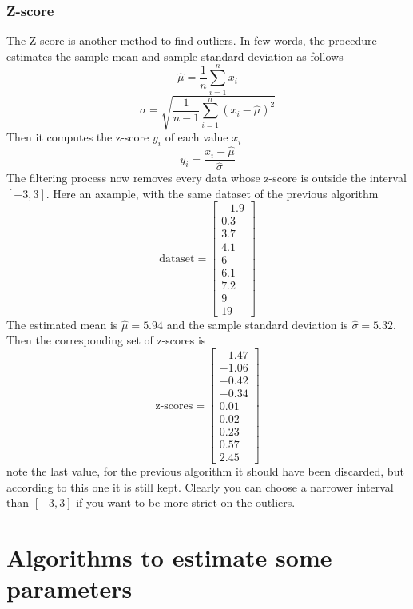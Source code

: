 \documentclass[12pt,twoside]{report}
\begin{document}
\subsection{Z-score}
The Z-score is another method to find outliers. In few words, the procedure estimates the sample mean and sample standard deviation as follows
\begin{equation}
    \hat{\mu}=\frac{1}{n}\sum_{i=1}^nx_i
\end{equation}
\begin{equation}
    \hat{\sigma}=\sqrt{\frac{1}{n-1}\sum_{i=1}^n(x_i-\hat{\mu})^2}
\end{equation}
Then it computes the z-score $y_i$ of each value $x_i$
\begin{equation}
    y_i=\frac{x_i-\hat{\mu}}{\hat{\sigma}}
\end{equation}
The filtering process now removes every data whose z-score is outside the interval $[-3,3]$. Here an axample, with the same dataset of the previous algorithm
$$
\text{dataset}=\begin{bmatrix}
-1.9\\ 
0.3\\ 
3.7\\
4.1\\
6\\
6.1\\
7.2\\
9\\
19
\end{bmatrix}
$$
The estimated mean is $\hat{\mu}=5.94$ and the sample standard deviation is $\hat{\sigma}=5.32$. Then the corresponding set of z-scores is
$$
\text{z-scores}=\begin{bmatrix}
-1.47\\
-1.06\\
-0.42\\
-0.34\\
0.01\\
0.02\\
0.23\\
0.57\\
2.45
\end{bmatrix}
$$
note the last value, for the previous algorithm it should have been discarded, but according to this one it is still kept. Clearly you can choose a narrower interval than $[-3,3]$ if you want to be more strict on the outliers.

\clearpage

\chapter{Algorithms to estimate some parameters}
\end{document}
